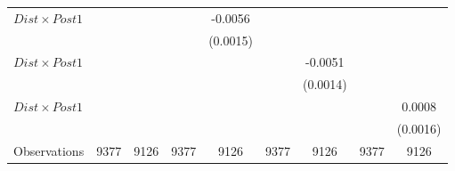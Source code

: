 {\begin{tabular}{l*{8}{c}}
\addlinespace
$ Dist \times Post1$&                  &                  &                  &  -0.0056\sym{***}&                  &                  &                  &                  \\
                &                  &                  &                  & (0.0015)         &                  &                  &                  &                  \\
\addlinespace
$ Dist \times Post1$&                  &                  &                  &                  &                  &  -0.0051\sym{***}&                  &                  \\
                &                  &                  &                  &                  &                  & (0.0014)         &                  &                  \\
\addlinespace
$ Dist \times Post1$&                  &                  &                  &                  &                  &                  &                  &   0.0008         \\
                &                  &                  &                  &                  &                  &                  &                  & (0.0016)         \\
\midrule
Observations    &     9377         &     9126         &     9377         &     9126         &     9377         &     9126         &     9377         &     9126         \\
\bottomrule
\end{tabular}
}
